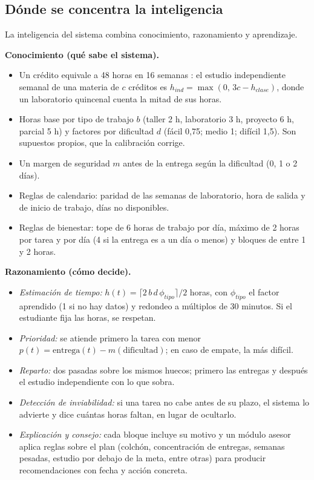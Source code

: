 \subsection{Dónde se concentra la inteligencia}

La inteligencia del sistema combina conocimiento, razonamiento y aprendizaje.

\textbf{Conocimiento (qué sabe el sistema).}
\begin{itemize}
    \item Un crédito equivale a 48 horas en 16 semanas \parencite{MEN2019}: el estudio independiente semanal de una materia de $c$ créditos es $h_{ind}=\max(0,\,3c-h_{clase})$, donde un laboratorio quincenal cuenta la mitad de sus horas.
    \item Horas base por tipo de trabajo $b$ (taller 2 h, laboratorio 3 h, proyecto 6 h, parcial 5 h) y factores por dificultad $d$ (fácil 0,75; medio 1; difícil 1,5). Son supuestos propios, que la calibración corrige.
    \item Un margen de seguridad $m$ antes de la entrega según la dificultad (0, 1 o 2 días).
    \item Reglas de calendario: paridad de las semanas de laboratorio, hora de salida y de inicio de trabajo, días no disponibles.
    \item Reglas de bienestar: tope de 6 horas de trabajo por día, máximo de 2 horas por tarea y por día (4 si la entrega es a un día o menos) y bloques de entre 1 y 2 horas.
\end{itemize}

\textbf{Razonamiento (cómo decide).}
\begin{itemize}
    \item \emph{Estimación de tiempo:} $h(t)=\lceil 2\,b\,d\,\phi_{tipo}\rceil/2$ horas, con $\phi_{tipo}$ el factor aprendido (1 si no hay datos) y redondeo a múltiplos de 30 minutos. Si el estudiante fija las horas, se respetan.
    \item \emph{Prioridad:} se atiende primero la tarea con menor $p(t)=\text{entrega}(t)-m(\text{dificultad})$; en caso de empate, la más difícil.
    \item \emph{Reparto:} dos pasadas sobre los mismos huecos; primero las entregas y después el estudio independiente con lo que sobra.
    \item \emph{Detección de inviabilidad:} si una tarea no cabe antes de su plazo, el sistema lo advierte y dice cuántas horas faltan, en lugar de ocultarlo.
    \item \emph{Explicación y consejo:} cada bloque incluye su motivo y un módulo asesor aplica reglas sobre el plan (colchón, concentración de entregas, semanas pesadas, estudio por debajo de la meta, entre otras) para producir recomendaciones con fecha y acción concreta.
\end{itemize}

